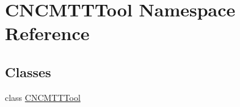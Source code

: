 \hypertarget{namespace_c_n_c_m_t_t_tool}{\section{C\-N\-C\-M\-T\-T\-Tool Namespace Reference}
\label{namespace_c_n_c_m_t_t_tool}
}
\subsection*{Classes}
\begin{DoxyCompactItemize}
\item 
class \hyperlink{class_c_n_c_m_t_t_tool_1_1_c_n_c_m_t_t_tool}{C\-N\-C\-M\-T\-T\-Tool}
\end{DoxyCompactItemize}
